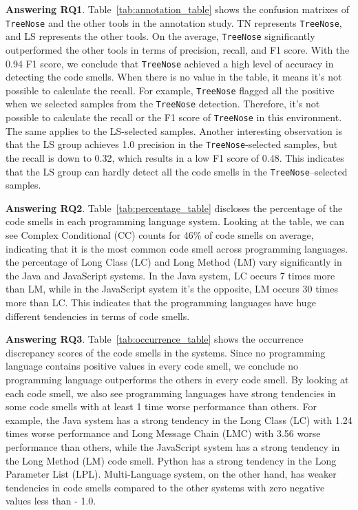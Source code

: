 


{\bf Answering RQ1}. Table~\ref{tab:annotation_table} shows the confusion
matrixes of \texttt{TreeNose} and the other tools in the annotation study. TN
represents \texttt{TreeNose}, and LS represents the other tools. On the
average, \texttt{TreeNose} significantly outperformed the other tools in terms
of precision, recall, and F1 score. With the 0.94 F1 score, we conclude that
\texttt{TreeNose} achieved a high level of accuracy in detecting the code
smells. When there is no value in the table, it means it's not possible to
calculate the recall. For example, \texttt{TreeNose} flagged all the positive
when we selected samples from the \texttt{TreeNose} detection. Therefore, it's
not possible to calculate the recall or the F1 score of \texttt{TreeNose} in
this environment. The same applies to the LS-selected samples. Another
interesting observation is that the LS group achieves 1.0 precision in the
\texttt{TreeNose}-selected samples, but the recall is down to 0.32, which
results in a low F1 score of 0.48. This indicates that the LS group can hardly
detect all the code smells in the \texttt{TreeNose}--selected samples.

{\bf Answering RQ2}. Table~\ref{tab:percentage_table} discloses the percentage
of the code smells in each programming language system. Looking at the table,
we can see Complex Conditional (CC) counts for 46\% of code smells on average,
indicating that it is the most common code smell across programming languages.
the percentage of Long Class (LC) and Long Method (LM) vary significantly in
the Java and JavaScript systems. In the Java system, LC occurs 7 times more
than LM, while in the JavaScript system it's the opposite, LM occurs 30 times
more than LC. This indicates that the programming languages have huge different
tendencies in terms of code smells.

{\bf Answering RQ3}. Table~\ref{tab:occurrence_table} shows the occurrence
discrepancy scores of the code smells in the systems. Since no programming
language contains positive values in every code smell, we conclude no
programming language outperforms the others in every code smell. By looking at
each code smell, we also see programming languages have strong tendencies in
some code smells with at least 1 time worse performance than others. For
example, the Java system has a strong tendency in the Long Class (LC) with 1.24
times worse performance and Long Message Chain (LMC) with 3.56 worse performance than others, 
while the JavaScript system has a strong
tendency in the Long Method (LM) code smell. Python has a strong tendency in
the Long Parameter List (LPL). Multi-Language system, on the other hand, has
weaker tendencies in code smells compared to the other systems with zero
negative values less than - 1.0.
